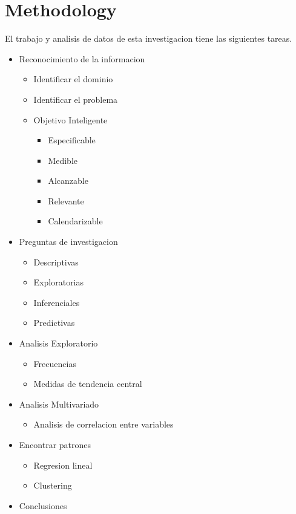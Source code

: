 \section{Methodology}
 El trabajo y analisis de datos de esta investigacion tiene las siguientes tareas.
 \begin{itemize}
  \item Reconocimiento de la informacion 
  \begin{itemize}
   \item Identificar el dominio
   \item Identificar el problema
   \item Objetivo Inteligente 
    \begin{itemize}
     \item Especificable
     \item Medible
     \item Alcanzable
     \item Relevante
     \item Calendarizable
    \end{itemize}
  \end{itemize}
  \item Preguntas de investigacion
  \begin{itemize}
   \item Descriptivas
   \item Exploratorias
   \item Inferenciales
   \item Predictivas
  \end{itemize}
  \item Analisis Exploratorio
  \begin{itemize}
   \item Frecuencias
   \item Medidas de tendencia central
  \end{itemize}
  \item Analisis Multivariado
  \begin{itemize}
	\item Analisis de correlacion entre variables
  \end{itemize}
  \item Encontrar patrones
   \begin{itemize}
    \item Regresion lineal
    \item Clustering
   \end{itemize}  
  \item Conclusiones
 \end{itemize}
